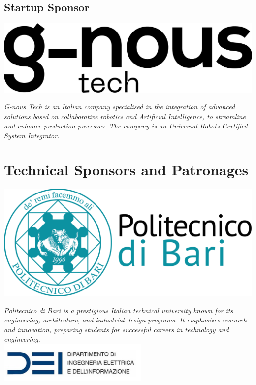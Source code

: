 \documentclass[
	openany, %
	parskip=full, %
	12pt, %
	a4paper, %
]{conferencebooklet} %
\begin{document}
\begin{multicols*}{2}
    \subsection{Startup Sponsor}    \hfill\includegraphics[width=\sponsorscaling\linewidth]{logos/gnous.png}\hspace*{\fill}
    
    \textit{G-nous Tech is an Italian company specialised in the integration of advanced solutions based on collaborative robotics and Artificial Intelligence, to streamline and enhance production processes. The company is an Universal Robots Certified System Integrator.} \\

    \section{Technical Sponsors and Patronages}

    \hfill\includegraphics[width=\sponsorscaling\linewidth]{logos/poliba.png}\hspace*{\fill}

    \textit{Politecnico di Bari is a prestigious Italian technical university known for its engineering, architecture, and industrial design programs. It emphasizes research and innovation, preparing students for successful careers in technology and engineering.} \\
    
    \hfill\includegraphics[width=\sponsorscaling\linewidth]{logos/dei.png}\hspace*{\fill}


\end{multicols*}
\end{document}
